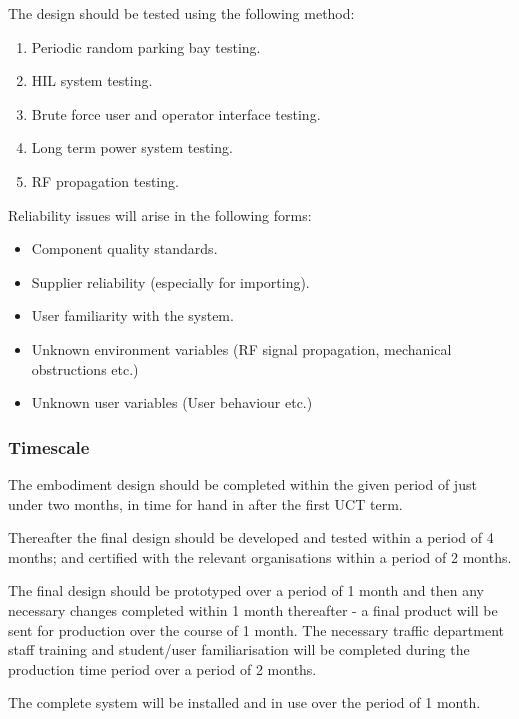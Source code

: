 The design should be tested using the following method:
\begin{enumerate}
\item Periodic random parking bay testing.
\item HIL system testing.
\item Brute force user and operator interface testing.
\item Long term power system testing.
\item RF propagation testing.
\end{enumerate}


Reliability issues will arise in the following forms:

\begin{itemize}
\item Component quality standards.
\item Supplier reliability (especially for importing).
\item User familiarity with the system.
\item Unknown environment variables (RF signal propagation, mechanical obstructions etc.)
\item Unknown user variables (User behaviour etc.)
\end{itemize}

\newpage
\subsubsection{Timescale}
The embodiment design should be completed within the given period of just under two months, in time for hand in after the first UCT term.

Thereafter the final design should be developed and tested within a period of 4 months; and certified with the relevant organisations within a period of 2 months.

The final design should be prototyped over a period of 1 month and then any necessary changes completed within 1 month thereafter - a final product will be sent for production over the course of 1 month. The necessary traffic department staff training and student/user familiarisation will be completed during the production time period over a period of 2 months.

The complete system will be installed and in use over the period of 1 month. 

